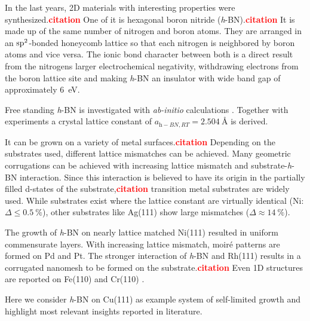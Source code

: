 In the last years, 2D materials with interesting properties were synthesized.\textcolor{red}{\textbf{citation}} One of it is hexagonal boron nitride (\textit{h}-BN).\textcolor{red}{\textbf{citation}} It is made up of the same number of nitrogen and boron atoms. They are arranged in an $\textnormal{sp}^2$-bonded honeycomb lattice so that each nitrogen is neighbored by boron atoms and vice versa. The ionic bond character between both is a direct result from the nitrogens larger electrochemical negativity, withdrawing electrons from the boron lattice site and making \textit{h}-BN an insulator with wide band gap of approximately \SI{6}{\eV}. \cite{watanabe_direct-bandgap_2004, cassabois_hexagonal_2016, blase_quasiparticle_1995}

Free standing \textit{h}-BN is investigated with \textit{ab-initio} calculations \cite{han_effects_2014,mortazavi_investigation_2012,topsakal_first-principles_2009,peng_mechanical_2012}. Together with experiments \cite{paszkowicz_lattice_2002} a crystal lattice constant of $a_{\textit{h}-BN, RT}=\SI{2.504}{\angstrom}$ is derived. 

It can be grown on a variety of metal surfaces.\textcolor{red}{\textbf{citation}} Depending on the substrates used, different lattice mismatches can be achieved. Many geometric corrugations can be achieved with increasing lattice mismatch and substrate-\textit{h}-BN interaction. Since this interaction is believed to have its origin in the partially filled d-states of the substrate,\textcolor{red}{\textbf{citation}} transition metal substrates are widely used. While substrates exist where the lattice constant are virtually identical (Ni: $\Delta \leq \SI{0.5}{\percent}$), other substrates like Ag(111) show large mismatches ($\Delta \approx \SI{14}{\percent}$). 

The growth of \textit{h}-BN on nearly lattice matched Ni(111) resulted in uniform commensurate layers. With increasing lattice mismatch, moir\'e patterns are formed on Pd and Pt. The stronger interaction of \textit{h}-BN and Rh(111) results in a corrugated nanomesh to be formed on the substrate.\textcolor{red}{\textbf{citation}} Even 1D structures are reported on Fe(110) \cite{vinogradov_one-dimensional_2012} and Cr(110) \cite{muller_one-dimensional_2008}. 

Here we consider \textit{h}-BN on Cu(111) as example system of self-limited growth and highlight most relevant insights reported in literature.\cite{joshi_boron_2012, schwarz_corrugation_2017, auwarter_hexagonal_2018}

